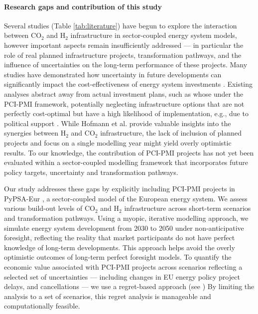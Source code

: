 \documentclass[pdflatex,sn-nature]{sn-jnl}%
\theoremstyle{thmstyleone}%
\theoremstyle{thmstyletwo}%
\theoremstyle{thmstylethree}%
\begin{document}
\paragraph{Research gaps and contribution of this study}
Several studies (Table \ref{tab:literature}) have begun to explore the interaction between CO$_2$ and H$_2$ infrastructure in sector-coupled energy system models, however important aspects remain insufficiently addressed --- in particular the role of real planned infrastructure projects, transformation pathways, and the influence of uncertainties on the long-term performance of these projects. Many studies have demonstrated how uncertainty in future developments can significantly impact the cost-effectiveness of energy system investments \cite{vanderweijdeEconomicsPlanningElectricity2012,mobiusRegretAnalysisInvestment2020,neumannNearoptimalFeasibleSpace2021,vangreevenbroekLittleLoseCase2025,priceModellingGenerateAlternatives2017,yueReviewApproachesUncertainty2018}. Existing analyses abstract away from actual investment plans, such as whose under the PCI-PMI framework, potentially neglecting infrastructure options that are not perfectly cost-optimal but have a high likelihood of implementation, e.g., due to political support \cite{vangreevenbroekLittleLoseCase2025,trutnevyteDoesCostOptimization2016}. 
While Hofmann et al. \cite{hofmannH2CO2Network2025} provide valuable insights into the synergies between H$_2$ and CO$_2$ infrastructure, the lack of inclusion of planned projects and focus on a single modelling year might yield overly optimistic results. To our knowledge, the contribution of PCI-PMI projects has not yet been evaluated within a sector-coupled modelling framework that incorporates future policy targets, uncertainty and transformation pathways.

Our study addresses these gaps by explicitly including PCI-PMI projects in PyPSA-Eur \cite{horschPyPSAEurOpenOptimisation2018}, a sector-coupled model of the European energy system. We assess various build-out levels of CO$_2$ and H$_2$ infrastructure across short-term scenarios and transformation pathways. Using a myopic, iterative modelling approach, we simulate energy system development from 2030 to 2050 under non-anticipative foresight, reflecting the reality that market participants do not have perfect knowledge of long-term developments. This approach helps avoid the overly optimistic outcomes of long-term perfect foresight models. To quantify the economic value associated with PCI-PMI projects across scenarios reflecting a selected set of uncertainties --- including changes in EU energy policy project delays, and cancellations --- we use a regret-based approach (see ) By limiting the analysis to a set of scenarios, this regret analysis is manageable and computationally feasible.
\end{document}
